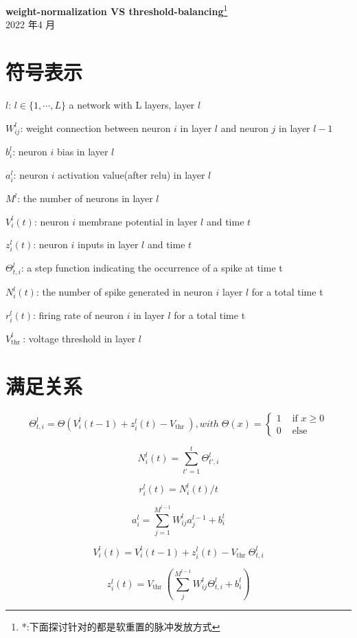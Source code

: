 \documentclass[a4paper,11pt,onecolumn,oneside,UTF8]{article}
\begin{document}
\begin{center}
    \Huge\textbf{weight-normalization VS threshold-balancing}\footnote[1]{*:下面探讨针对的都是软重置的脉冲发放方式}
    \\[20pt]
    \Large\textnormal{2022 年4 月}
\end{center}

\section*{符号表示}
$l$: $l \in \{1, \cdots ,L\}$ a network with L layers, layer $l$

$W_{ij}^l$: weight connection between neuron $i$ in layer $l$ and neuron $j$ in layer $l-1$

$b_i^l$: neuron $i$ bias in layer $l$

$a_i^l$: neuron $i$ activation value(after relu) in layer $l$

$M^l$: the number of neurons in layer $l$

$V_i^l(t)$: neuron $i$ membrane potential in layer $l$ and time $t$

$z_i^l(t)$: neuron $i$ inputs in layer $l$ and time $t$

$\Theta_{t,i}^{l}$: a step function indicating the occurrence of a spike at time t

$N_i^l(t)$: the number of spike generated in neuron $i$ layer $l$ for a total time t

$r_i^l(t)$: firing rate of neuron $i$ in layer $l$ for a total time t

$V_{\text {thr }}^l$: voltage threshold in layer $l$


\section*{满足关系}
$$\Theta_{t, i}^{l}=\Theta\left(V_{i}^{l}(t-1)+z_{i}^{l}(t)-V_{\text {thr }}\right), with \; \Theta(x)= \begin{cases}1 & \text { if } x \geq 0 \\ 0 & \text { else }\end{cases}$$


$$N_i^l(t) = \sum_{t'=1}^t\Theta_{t',i}^l$$

$$r_i^l(t) = N_i^l(t)/t$$

$$a_i^l = \sum_{j=1}^{M^{l-1}}W_{ij}^la_j^{l-1} + b_i^l$$

$$V_i^l(t)=V_{i}^{l}(t-1)+z_{i}^{l}(t)-V_{\text {thr }}\Theta_{t,i}^{l}$$

\begin{equation}
    z_{i}^{l}(t) = V_{\text {thr }}\left(\sum_j^{M^{l-1}}W_{ij}^l\Theta_{t,i}^{l}+b_i^l\right) \tag*{*}
\end{equation}
\end{document}
